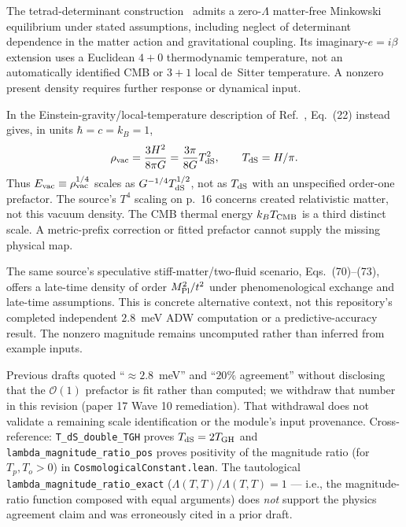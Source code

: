 \documentclass[aps,prd,twocolumn,showpacs,superscriptaddress,nofootinbib]{revtex4-2}
\begin{document}
The tetrad-determinant construction~\cite{Volovik2021CombinedLorentz}
admits a zero-$\Lambda$ matter-free Minkowski equilibrium under stated
assumptions, including neglect of determinant dependence in the matter
action and gravitational coupling. Its imaginary-$e=i\beta$ extension
uses a Euclidean $4{+}0$ thermodynamic temperature, not an automatically
identified CMB or $3{+}1$ local de~Sitter temperature. A nonzero present
density requires further response or dynamical input.

In the Einstein-gravity/local-temperature description of
Ref.~\cite{Volovik2024DeSitterThermodynamics}, Eq.~(22) instead gives,
in units $\hbar=c=k_B=1$,
\begin{equation}
\rho_{\rm vac}=\frac{3H^2}{8\pi G}
              =\frac{3\pi}{8G}T_{\rm dS}^2,
\qquad T_{\rm dS}=H/\pi.
\end{equation}
Thus $E_{\rm vac}\equiv\rho_{\rm vac}^{1/4}$ scales as
$G^{-1/4}T_{\rm dS}^{1/2}$, not as $T_{\rm dS}$ with an unspecified
order-one prefactor. The source's $T^4$ scaling on p.~16 concerns
created relativistic matter, not this vacuum density. The CMB thermal
energy $k_B T_{\rm CMB}$ is a third distinct scale. A metric-prefix
correction or fitted prefactor cannot supply the missing physical map.

The same source's speculative stiff-matter/two-fluid scenario,
Eqs.~(70)--(73), offers a late-time density of order $M_{\rm Pl}^2/t^2$
under phenomenological exchange and late-time assumptions. This is
concrete alternative context, not this repository's completed independent
$2.8$~meV ADW computation or a predictive-accuracy result. The nonzero
magnitude remains uncomputed rather than inferred from example inputs.

Previous drafts quoted ``$\approx 2.8$~meV'' and
``$20\%$ agreement'' without disclosing that the $\mathcal{O}(1)$
prefactor is fit rather than computed; we withdraw that number in this
revision (paper 17 Wave 10 remediation). That withdrawal does not
validate a remaining scale identification or the module's input provenance.
Cross-reference:
\texttt{T\_dS\_double\_TGH} proves $T_{\rm dS} = 2 T_{\rm GH}$ and
\texttt{lambda\_magnitude\_ratio\_pos} proves positivity of the
magnitude ratio (for $T_p, T_o > 0$) in \texttt{CosmologicalConstant.lean}.
The tautological \texttt{lambda\_magnitude\_ratio\_exact}
($\Lambda(T,T)/\Lambda(T,T) = 1$ --- i.e., the magnitude-ratio
function composed with equal arguments) does \emph{not} support the
physics agreement claim and was erroneously cited in a prior draft.
\end{document}
